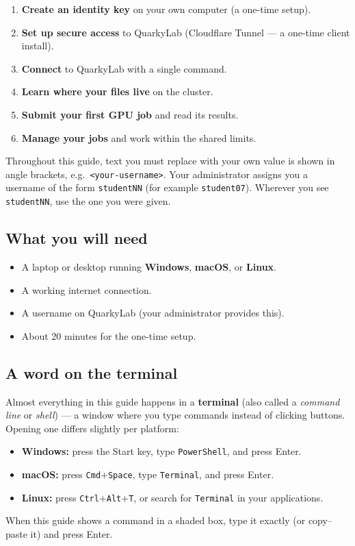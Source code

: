 \documentclass[11pt]{article}
\newcommand{\LabName}{QuarkyLab}                       %
\newcommand{\code}[1]{\texttt{#1}}
\begin{document}
\begin{enumerate}
  \item \textbf{Create an identity key} on your own computer (a one-time setup).
  \item \textbf{Set up secure access} to \LabName{} (Cloudflare Tunnel --- a one-time client install).
  \item \textbf{Connect} to \LabName{} with a single command.
  \item \textbf{Learn where your files live} on the cluster.
  \item \textbf{Submit your first GPU job} and read its results.
  \item \textbf{Manage your jobs} and work within the shared limits.
\end{enumerate}

\begin{notebox}
Throughout this guide, text you must replace with your own value is shown in angle brackets, e.g.\ \code{<your-username>}. Your administrator assigns you a username of the form \code{studentNN} (for example \code{student07}). Wherever you see \code{studentNN}, use the one you were given.
\end{notebox}

\subsection{What you will need}
\begin{itemize}
  \item A laptop or desktop running \textbf{Windows}, \textbf{macOS}, or \textbf{Linux}.
  \item A working internet connection.
  \item A username on \LabName{} (your administrator provides this).
  \item About 20 minutes for the one-time setup.
\end{itemize}

\subsection{A word on the terminal}
Almost everything in this guide happens in a \textbf{terminal} (also called a \emph{command line} or \emph{shell}) --- a window where you type commands instead of clicking buttons. Opening one differs slightly per platform:
\begin{itemize}
  \item \textbf{Windows:} press the Start key, type \code{PowerShell}, and press Enter.
  \item \textbf{macOS:} press \code{Cmd}+\code{Space}, type \code{Terminal}, and press Enter.
  \item \textbf{Linux:} press \code{Ctrl}+\code{Alt}+\code{T}, or search for \code{Terminal} in your applications.
\end{itemize}
When this guide shows a command in a shaded box, type it exactly (or copy--paste it) and press Enter.
\end{document}
